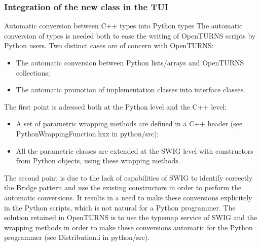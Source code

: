 \documentclass[8pt]{beamer}
\begin{document}
\begin{frame}
  \frametitle{Integration of the new class in the TUI}
  \begin{block}{Automatic conversion between C++ types into Python types}
    The automatic conversion of types is needed both to ease the writing of OpenTURNS scripts by Python users. Two distinct cases are of concern with OpenTURNS:
    \begin{itemize}
    \item The automatic conversion between Python lists/arrays and OpenTURNS collections;
    \item The automatic promotion of implementation classes into interface classes.
    \end{itemize}
    The first point is adressed both at the Python level and the C++ level:
    \begin{itemize}
    \item A set of parametric wrapping methods are defined in a C++ header (see PythonWrappingFunction.hxx in python/src);
    \item All the parametric classes are extended at the SWIG level with constructors from Python objects, using these wrapping methods.
    \end{itemize}
    The second point is due to the lack of capabilities of SWIG to identify correctly the Bridge pattern and use the existing constructors in order to perform the automatic conversions. It results in a need to make these conversions explicitely in the Python scripts, which is not natural for a Python programmer. The solution retained in OpenTURNS is to use the {\ttfamily typemap} service of SWIG and the wrapping methods in order to make these conversions automatic for the Python programmer (see Distribution.i in python/src).
  \end{block}
\end{frame}
\end{document}
